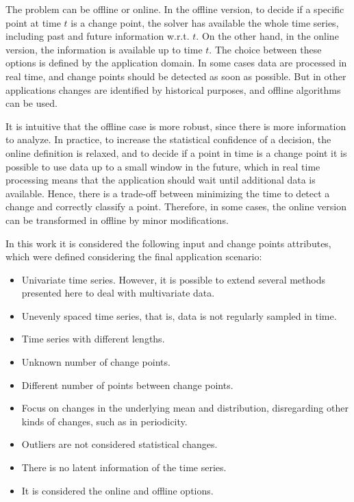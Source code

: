 The problem can be offline or online. In the offline version, to decide if a
specific point at time $t$ is a change point, the solver has available the
whole time series, including past and future information w.r.t. $t$. On the
other hand, in the online version, the information is available up to time $t$.
The choice between these options is defined by the application domain. In some
cases data are processed in real time, and change points should be detected as
soon as possible. But in other applications changes are identified by historical
purposes, and offline algorithms can be used.

It is intuitive that the offline case is more robust, since there is more
information to analyze. In practice, to increase the statistical confidence of
a decision, the online definition is relaxed, and to decide if a point in time
is a change point it is possible to use data up to a small window in the future,
which in real time processing means that the application should wait until
additional data is available. Hence, there is a trade-off between minimizing
the time to detect a change and correctly classify a point. Therefore, in some
cases, the online version can be transformed in offline by minor modifications.

In this work it is considered the following input and change points attributes,
which were defined considering the final application scenario:
\begin{itemize}
\item Univariate time series. However, it is possible to extend several
    methods presented here to deal with multivariate data.
\item Unevenly spaced time series, that is, data is not regularly sampled in
    time.
\item Time series with different lengths.
\item Unknown number of change points.
\item Different number of points between change points.
\item Focus on changes in the underlying mean and distribution, disregarding
    other kinds of changes, such as in periodicity.
\item Outliers are not considered statistical changes.
\item There is no latent information of the time series.
\item It is considered the online and offline options.
\end{itemize}

